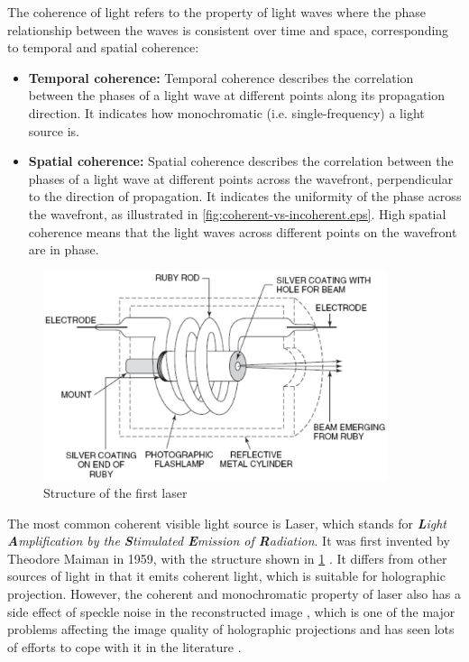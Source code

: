The coherence of light refers to the property of light waves where the phase relationship between the waves is consistent over time and space, corresponding to temporal and spatial coherence:
\begin{itemize}
  \item \textbf{Temporal coherence:} Temporal coherence describes the correlation between the phases of a light wave at different points along its propagation direction. It indicates how monochromatic (i.e. single-frequency) a light source is.
  \item \textbf{Spatial coherence:} Spatial coherence describes the correlation between the phases of a light wave at different points across the wavefront, perpendicular to the direction of propagation. It indicates the uniformity of the phase across the wavefront, as illustrated in \cref{fig:coherent-vs-incoherent.eps}. High spatial coherence means that the light waves across different points on the wavefront are in phase.
\end{itemize}

\begin{figure}[H]
	\centering
	\includegraphics[width=0.9\textwidth]{first_laser.jpg}
	\caption{Structure of the first laser \cite{Hecht2008}}
	\label{fig:first_laser}
\end{figure}

The most common coherent visible light source is Laser, which stands for \textit{\textbf{L}ight \textbf{A}mplification by the \textbf{S}timulated \textbf{E}mission of \textbf{R}adiation}. It was first invented by Theodore Maiman in 1959, with the structure shown in \cref{fig:first_laser} \cite{Hecht2008, Gordon1959, Cartlidge2007}. It differs from other sources of light in that it emits coherent light, which is suitable for holographic projection. However, the coherent and monochromatic property of laser also has a side effect of speckle noise in the reconstructed image \cite{John1966}, which is one of the major problems affecting the image quality of holographic projections and has seen lots of efforts to cope with it in the literature \cite{Cable2004,Stangner2017,Deng2021,Hands2022}.


